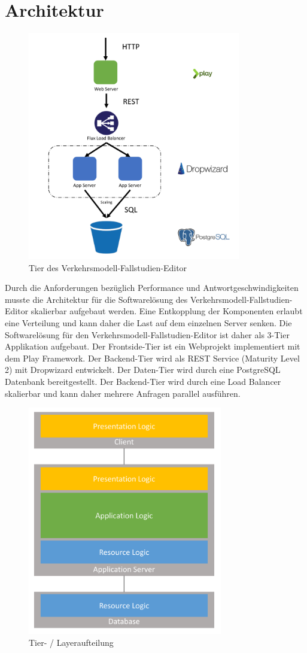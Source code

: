 \section{Architektur}
\begin{figure}[H]
\centering
\includegraphics[height=10cm]{images/Architektur.png}
\caption{Tier des Verkehrsmodell-Fallstudien-Editor}
\label{tier_architecture}
\end{figure}
Durch die Anforderungen bezüglich Performance und Antwortgeschwindigkeiten musste die Architektur für die Softwarelösung des Verkehrsmodell-Fallstudien-Editor skalierbar aufgebaut werden. Eine Entkopplung der Komponenten erlaubt eine Verteilung und kann daher die Last auf dem einzelnen Server senken. Die Softwarelösung für den Verkehrsmodell-Fallstudien-Editor ist daher als 3-Tier Applikation aufgebaut. Der Frontside-Tier ist ein Webprojekt implementiert mit dem Play Framework. Der Backend-Tier wird als REST Service (Maturity Level 2) mit Dropwizard entwickelt. Der Daten-Tier wird durch eine PostgreSQL Datenbank bereitgestellt. Der Backend-Tier wird durch eine Load Balancer skalierbar und kann daher mehrere Anfragen parallel ausführen.\\
\begin{figure}[H]
\centering
\includegraphics[height=10cm]{images/layers.png}
\caption{Tier- / Layeraufteilung}
\label{fig:tierlayers}
\end{figure}
